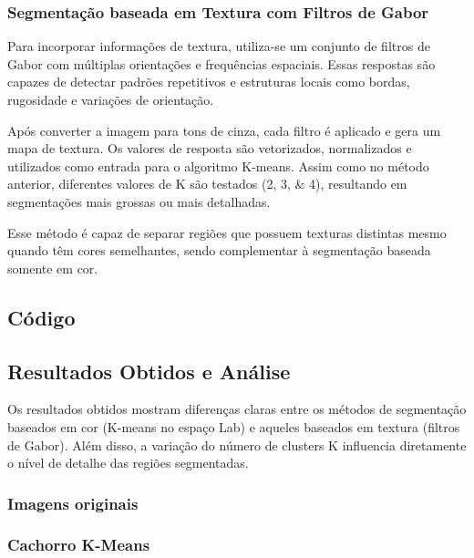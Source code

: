 \documentclass[../main.tex]{subfiles}
\begin{document}
\subsubsection{Segmentação baseada em Textura com Filtros de Gabor}
Para incorporar informações de textura, utiliza-se um conjunto de filtros de Gabor com múltiplas orientações e frequências espaciais. Essas respostas são capazes de detectar padrões repetitivos e estruturas locais como bordas, rugosidade e variações de orientação.

Após converter a imagem para tons de cinza, cada filtro é aplicado e gera um mapa de textura. Os valores de resposta são vetorizados, normalizados e utilizados como entrada para o algoritmo K-means. Assim como no método anterior, diferentes valores de K são testados (\numlist{2;3;4}), resultando em segmentações mais grossas ou mais detalhadas.

Esse método é capaz de separar regiões que possuem texturas distintas mesmo quando têm cores semelhantes, sendo complementar à segmentação baseada somente em cor.

\subsection{Código}







\subsection{Resultados Obtidos e Análise}

Os resultados obtidos mostram diferenças claras entre os métodos de segmentação baseados em cor (K-means no espaço Lab) e aqueles baseados em textura (filtros de Gabor). Além disso, a variação do número de clusters K influencia diretamente o nível de detalhe das regiões segmentadas.

\subsubsection{Imagens originais}


\subsubsection{Cachorro K-Means}
\end{document}
